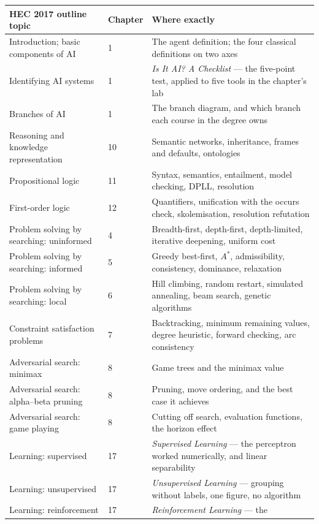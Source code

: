 \begin{longtable}{@{}L{6.4cm}L{2.0cm}L{6.6cm}@{}}
\toprule
{}
\textbf{HEC 2017 outline topic} & \textbf{Chapter} & \textbf{Where exactly} \\
\midrule
\endhead
Introduction; basic components of AI & 1 & The agent definition; the four
classical definitions on two axes \\
Identifying AI systems & 1 & \emph{Is It AI? A Checklist} --- the five-point test,
applied to five tools in the chapter's lab \\
Branches of AI & 1 & The branch diagram, and which branch each course in the
degree owns \\
Reasoning and knowledge representation & 10 & Semantic networks, inheritance,
frames and defaults, ontologies \\
Propositional logic & 11 & Syntax, semantics, entailment, model checking, DPLL,
resolution \\
First-order logic & 12 & Quantifiers, unification with the occurs check,
skolemisation, resolution refutation \\
Problem solving by searching: uninformed & 4 & Breadth-first, depth-first,
depth-limited, iterative deepening, uniform cost \\
Problem solving by searching: informed & 5 & Greedy best-first, $A^{*}$,
admissibility, consistency, dominance, relaxation \\
Problem solving by searching: local & 6 & Hill climbing, random restart,
simulated annealing, beam search, genetic algorithms \\
Constraint satisfaction problems & 7 & Backtracking, minimum remaining values,
degree heuristic, forward checking, arc consistency \\
Adversarial search: minimax & 8 & Game trees and the minimax value \\
Adversarial search: alpha--beta pruning & 8 & Pruning, move ordering, and the
best case it achieves \\
Adversarial search: game playing & 8 & Cutting off search, evaluation functions,
the horizon effect \\
Learning: supervised & 17 & \emph{Supervised Learning} --- the perceptron worked
numerically, and linear separability \\
Learning: unsupervised & 17 & \emph{Unsupervised Learning} --- grouping without
labels, one figure, no algorithm \\
Learning: reinforcement & 17 & \emph{Reinforcement Learning} --- the

\end{longtable}
